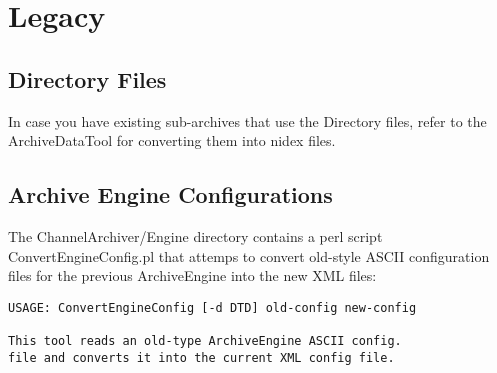 \chapter{Legacy}

\section{Directory Files}
In case you have existing sub-archives that use the Directory files,
refer to the ArchiveDataTool for converting them into nidex files.

\section{Archive Engine Configurations}
The ChannelArchiver/Engine directory contains a perl script
ConvertEngineConfig.pl that attemps to convert old-style ASCII
configuration files for the previous ArchiveEngine into the new XML
files:

\begin{lstlisting}[keywordstyle=\sffamily]
USAGE: ConvertEngineConfig [-d DTD] old-config new-config
 
This tool reads an old-type ArchiveEngine ASCII config.
file and converts it into the current XML config file.
\end{lstlisting}
